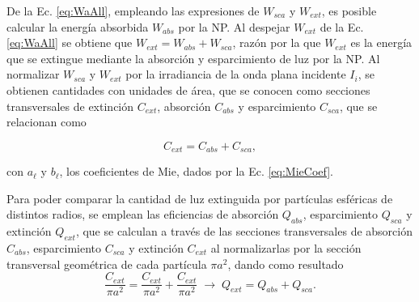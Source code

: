 De la Ec. \eqref{eq:WaAll}, empleando las expresiones de $W_{sca}$ y $W_{ext}$, es posible calcular la energía absorbida $W_{abs}$ por la NP. Al despejar $W_{ext}$ de la Ec. \eqref{eq:WaAll} se obtiene que $W_{ext} = W_{abs}+W_{sca}$, razón por la que $W_{ext}$ es la energía que se extingue  mediante la absorción y esparcimiento de luz por la NP. Al normalizar $W_{sca}$ y $W_{ext}$ por la irradiancia de la onda plana incidente $I_i$, se obtienen cantidades con unidades de área, que se conocen como secciones transversales de extinción $C_{ext}$, absorción  $C_{abs}$ y esparcimiento $C_{sca}$, que se relacionan como \vspace*{-.75em}
%
	\begin{tcolorbox}[title = {Secciones transversales de extinción, absorción y esparcimiento}, breakable ]
	\begin{equation}
	C_{ext} = C_{abs} + C_{sca},
	\end{equation}	

	con $a_\ell$ y $b_\ell$, los coeficientes de Mie, dados por la Ec. \eqref{eq:MieCoef}.
	\end{tcolorbox}\vspace*{-.75em} \noindent
%
Para poder comparar la cantidad de luz extinguida por partículas esféricas de distintos radios, se emplean las eficiencias de absorción $Q_{abs}$, esparcimiento $Q_{sca}$ y extinción $Q_{ext}$, que se calculan a través de las secciones transversales de absorción $C_{abs}$, esparcimiento $C_{sca}$ y extinción $C_{ext}$ al normalizarlas por la sección transversal geométrica de cada partícula $\pi a^2$, dando como resultado
%
\begin{equation}
\frac{C_{ext}}{\pi a^2} = \frac{C_{ext}}{\pi a^2}  + \frac{C_{ext}}{\pi a^2} 
\;\longrightarrow\; 	Q_{ext} = Q_{abs} + Q_{sca}.
\end{equation}
%
